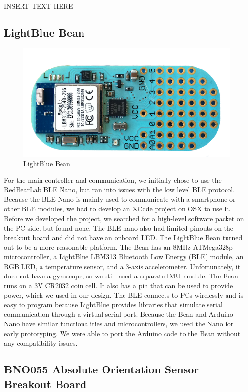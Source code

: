 \documentclass[12pt,journal]{IEEEtran}
\begin{document}
INSERT TEXT HERE

\subsection{LightBlue Bean}

\begin{figure}[H]
  \centering
    \includegraphics[width=0.8\linewidth]{figures/bean}
  \caption{LightBlue Bean}
  \label{fig:bean}
\end{figure}

	For the main controller and communication, we initially chose to use the RedBearLab BLE Nano, but ran into issues with the low level BLE protocol. Because  the BLE Nano is mainly used to communicate with a smartphone or other BLE modules, we had to develop an XCode project on OSX to use it. Before we developed the project, we searched for a high-level software packet on the PC side, but found none. The BLE nano also had limited pinouts on the breakout board and did not have an onboard LED. 
The LightBlue Bean turned out to be a more reasonable platform. The Bean has an 8MHz ATMega328p microcontroller, a LightBlue LBM313 Bluetooth Low Energy (BLE) module, an RGB LED, a temperature sensor, and a 3-axis accelerometer. Unfortunately, it does not have a gyroscope, so we still need a separate IMU module. The Bean runs on a 3V CR2032 coin cell. It also has a pin that can be used to provide power, which we used in our design. The BLE connects to PCs wirelessly and is easy to program because LightBlue provides libraries that simulate serial communication through a virtual serial port. Because the Bean and Arduino Nano have similar functionalities and microcontrollers, we used the Nano for early prototyping. We were able to port the Arduino code to the Bean without any compatibility issues.

\subsection{BNO055 Absolute Orientation Sensor Breakout Board}
\end{document}
